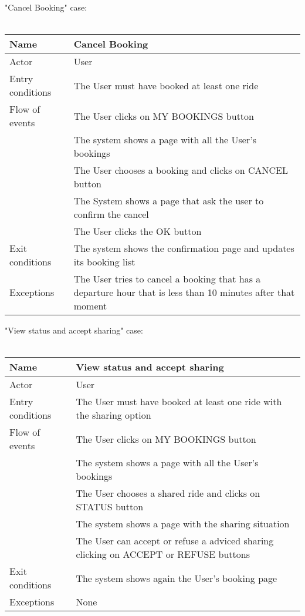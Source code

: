 \newpage
"Cancel Booking" case:
\\
\\
\begin{tabular}{|l|p{10cm}|} 
\hline
Name & Cancel Booking\\
\hline
Actor & User\\
\hline
Entry conditions & The User must have booked at least one ride\\
\hline
Flow of events
			&	\tabitem The User clicks on MY BOOKINGS button\\
			&	\tabitem The system shows a page with all the User's bookings\\
			&	\tabitem The User chooses a booking and clicks on CANCEL button\\
			&	\tabitem The System shows a page that ask the user to confirm the cancel \askpippo\\
			&	\tabitem The User clicks the OK button\\	
\hline
Exit conditions & The system shows the confirmation page and updates its booking list\\
\hline
Exceptions & The User tries to cancel a booking that has a departure hour that is less than 10 minutes after that moment\\
\hline
\end {tabular}

\newpage
"View status and accept sharing" case:
\\
\\
\begin{tabular}{|l|p{10cm}|} 
\hline
Name & View status and accept sharing\\
\hline
Actor & User\\
\hline
Entry conditions & The User must have booked at least one ride with the sharing option\\
\hline
Flow of events
			&	\tabitem The User clicks on MY BOOKINGS button\\
			&	\tabitem The system shows a page with all the User's bookings\\
			&	\tabitem The User chooses a shared ride and clicks on STATUS button\\
			&	\tabitem The system shows a page with the sharing situation\\
			&	\tabitem The User can accept or refuse a adviced sharing clicking on ACCEPT or REFUSE buttons\\
	
\hline
Exit conditions & The system shows again the User's booking page\\
\hline
Exceptions & None\\
\hline
\end {tabular}

